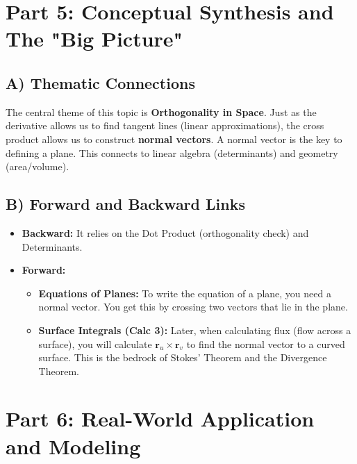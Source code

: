 \documentclass[11pt]{article}
\renewcommand{\vec}[1]{\mathbf{#1}}
\begin{document}
\newpage

\section{Part 5: Conceptual Synthesis and The "Big Picture"}

\subsection{A) Thematic Connections}
The central theme of this topic is \textbf{Orthogonality in Space}. Just as the derivative allows us to find tangent lines (linear approximations), the cross product allows us to construct \textbf{normal vectors}. A normal vector is the key to defining a plane. This connects to linear algebra (determinants) and geometry (area/volume).

\subsection{B) Forward and Backward Links}
\begin{itemize}
    \item \textbf{Backward:} It relies on the Dot Product (orthogonality check) and Determinants.
    \item \textbf{Forward:}
    \begin{itemize}
        \item \textbf{Equations of Planes:} To write the equation of a plane, you need a normal vector. You get this by crossing two vectors that lie in the plane.
        \item \textbf{Surface Integrals (Calc 3):} Later, when calculating flux (flow across a surface), you will calculate $\vec{r}_u \times \vec{r}_v$ to find the normal vector to a curved surface. This is the bedrock of Stokes' Theorem and the Divergence Theorem.
    \end{itemize}
\end{itemize}

\section{Part 6: Real-World Application and Modeling}
\end{document}
